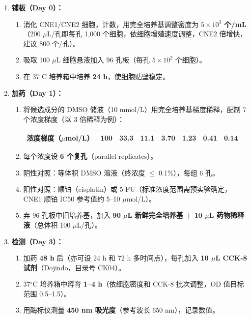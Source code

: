 \documentclass[12pt,a4paper,twoside]{article}
\begin{document}
\begin{enumerate}
  \item \textbf{铺板（Day 0）：}
    \begin{enumerate}
      \item 消化 CNE1/CNE2 细胞，计数，用完全培养基调整密度为 \textbf{$5 \times 10^3$ 个/mL}（200 $\mu$L/孔即每孔 1,000 个细胞，依细胞增殖速度调整，CNE2 倍增快，建议 800 个/孔）。
      \item 吸取 100 $\mu$L 细胞悬液加入 96 孔板（每孔 $5 \times 10^2$ 个细胞）。
      \item 在 37$^{\circ}$C 培养箱中培养 \textbf{24 h}，使细胞贴壁稳定。
    \end{enumerate}

  \item \textbf{加药（Day 1）：}
    \begin{enumerate}
      \item 将候选成分的 DMSO 储液（10 mmol/L）用完全培养基梯度稀释，配制 7 个浓度梯度（以 3 倍稀释为例）：
        \begin{center}
        \begin{tabular}{llllllll}
        \toprule
        \textbf{浓度梯度（$\mu$mol/L）} & 100 & 33.3 & 11.1 & 3.70 & 1.23 & 0.41 & 0.14 \\
        \bottomrule
        \end{tabular}
        \end{center}
      \item 每个浓度设 \textbf{6 个复孔}（parallel replicates）。
      \item 阴性对照：等体积 DMSO 溶液（终浓度 $\leq$ 0.1\%），每组 6 孔。
      \item 阳性对照：顺铂（cisplatin）或 5-FU（标准浓度范围需预实验确定，CNE1 顺铂 IC50 参考值约 5--10 $\mu$mol/L）。
      \item 弃 96 孔板中旧培养基，加入 \textbf{90 $\mu$L 新鲜完全培养基 + 10 $\mu$L 药物稀释液}（总体积 100 $\mu$L/孔）。
    \end{enumerate}

  \item \textbf{检测（Day 3）：}
    \begin{enumerate}
      \item 加药 \textbf{48 h} 后（亦可设 24 h 和 72 h 多时间点），每孔加入 \textbf{10 $\mu$L CCK-8 试剂}（Dojindo，目录号 CK04）。
      \item 37$^{\circ}$C 培养箱中孵育 \textbf{1--4 h}（依细胞密度和 CCK-8 批次调整，OD 值目标范围 0.5--1.5）。
      \item 用酶标仪测量 \textbf{450 nm 吸光度}（参考波长 650 nm），记录数值。
    \end{enumerate}


\end{enumerate}
\end{document}
